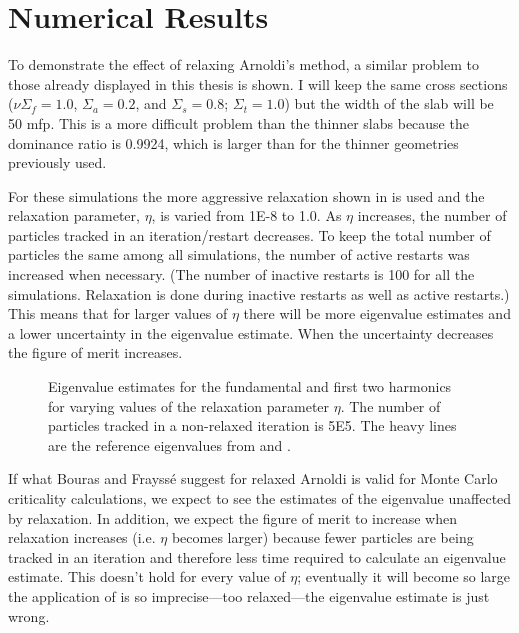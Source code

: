 \section{Numerical Results} \label{sec:RelaxedNumericalResults}
To demonstrate the effect of relaxing Arnoldi's method, a similar problem to those already displayed in this thesis is shown.  I will keep the same cross sections (\mbox{$\nu\Sigma_f = 1.0$}, \mbox{$\Sigma_a = 0.2$}, and \mbox{$\Sigma_s = 0.8$}; \mbox{$\Sigma_t = 1.0$}) but the width of the slab will be 50 mfp.  This is a more difficult problem than the thinner slabs because the dominance ratio is 0.9924, which is larger than for the thinner geometries previously used.  

For these simulations the more aggressive relaxation shown in   is used and the  relaxation parameter, $\eta$, is varied from 1E-8 to 1.0.  As $\eta$ increases, the number of particles tracked in an iteration/restart decreases.  To keep the total number of particles the same among all simulations, the number of active restarts was increased when necessary.  (The number of inactive restarts is 100 for all the simulations.  Relaxation is done during inactive restarts as well as active restarts.)  This means that for larger values of $\eta$ there will be more eigenvalue estimates and a lower uncertainty in the eigenvalue estimate.  When the uncertainty decreases the figure of merit increases.  

\begin{sidewaysfigure}\centering
    
    \caption{Eigenvalue estimates for the fundamental and first two harmonics for varying values of the relaxation parameter $\eta$.  The number of particles tracked in a non-relaxed iteration is 5E5.  The heavy lines are the reference eigenvalues from \cite{Garis:1991One-s-0} and \cite{Dahl:1979Eigen-0}.}
    \label{fig:RelaxedArnoldi}
\end{sidewaysfigure}

If what Bouras and Frayss\'{e} suggest for relaxed Arnoldi is valid for Monte Carlo criticality calculations, we expect to see the estimates of the eigenvalue unaffected by relaxation.  In addition, we expect the figure of merit to increase when relaxation increases (i.e. $\eta$ becomes larger) because fewer particles are being tracked in an iteration and therefore less time required to calculate an eigenvalue estimate.  This doesn't hold for every value of $\eta$; eventually it will become so large the application of \A{} is so imprecise---too relaxed---the eigenvalue estimate is just wrong.  

